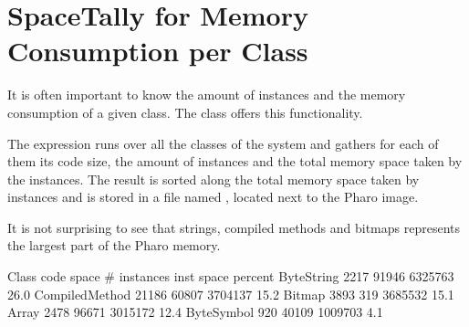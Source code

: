 \documentclass[a4paper,10pt,twoside]{book}
\begin{document}
%
%
%		
%
%


\section{SpaceTally for Memory Consumption per Class}

It is often important to know the amount of instances and the memory consumption of a given class. The class  offers this functionality. 

The expression  runs over all the classes of the system and gathers for each of them its code size, the amount of instances and the total memory space taken by the instances. The result is sorted along the total memory space taken by instances and is stored in a file named , located next to the Pharo image. 

It is not surprising to see that strings, compiled methods and bitmaps represents the largest part of the Pharo memory. 

\begin{code}{}
Class                          	 code space   # instances  inst space percent
ByteString                        2217       	91946         6325763    26.0
CompiledMethod            	21186      	 60807        3704137    15.2
Bitmap                              3893          319            3685532    15.1
Array                          	      2478      	96671        3015172    12.4
ByteSymbol     					920       	   40109        1009703     4.1
\end{code}
\end{document}
